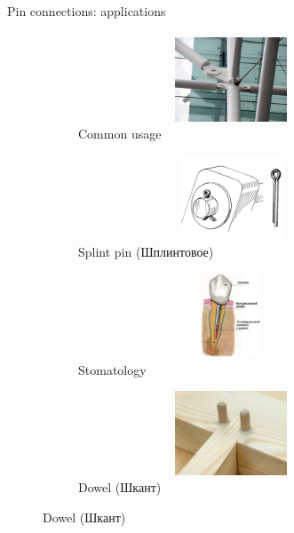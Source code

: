 \documentclass[aspectratio=169]{beamer}
\begin{document}
\begin{frame}[t]{Pin connections: applications}
    \framesubtitle{}
    \vspace{-0.6cm}
    \begin{figure}[H]
        \begin{subfigure}{0.49\textwidth}
            \centering\includegraphics[height=2.5cm,width=1\textwidth,keepaspectratio]{pin_use_1.png}
            \caption*{Common usage}
            \label{fig:pin_use_1.png}
        \end{subfigure}
        \begin{subfigure}{0.49\textwidth}
            \centering\includegraphics[height=2.5cm,width=1\textwidth,keepaspectratio]{pin_use_2.png}
            \caption*{Splint pin (Шплинтовое)}
            \label{fig:pin_use_2.png}
        \end{subfigure}

        \begin{subfigure}{0.49\textwidth}
            \centering\includegraphics[height=2.5cm,width=1\textwidth,keepaspectratio]{pin_use_3.jpg}
            \caption*{Stomatology}
            \label{fig:pin_use_3.jpg}
        \end{subfigure}
        \begin{subfigure}{0.49\textwidth}
            \centering\includegraphics[height=2.5cm,width=1\textwidth,keepaspectratio]{dowel.jpeg}
            \caption*{Dowel (Шкант)}
            \label{fig:dowel.jpeg}
        \end{subfigure}
    \end{figure}
\end{frame}
\end{document}
